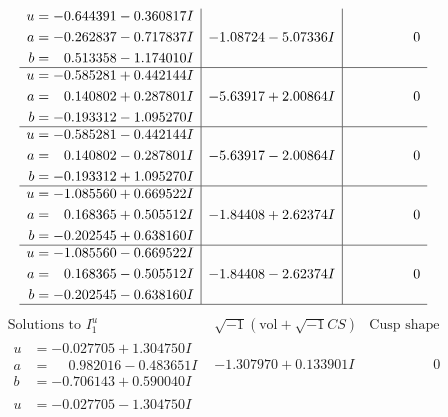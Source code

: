 \documentclass[1p]{elsarticle_modified}
\theoremstyle{definition}
\newcommand{\I}{\sqrt{-1}}
\begin{document}
$$\begin{array}{c|c|c}
\begin{aligned}
u &= -0.644391 - 0.360817 I \\
a &= -0.262837 - 0.717837 I \\
b &= \phantom{-}0.513358 - 1.174010 I\end{aligned}
 & -1.08724 - 5.07336 I & \phantom{-0.000000 } 0 \\ \hline\begin{aligned}
u &= -0.585281 + 0.442144 I \\
a &= \phantom{-}0.140802 + 0.287801 I \\
b &= -0.193312 - 1.095270 I\end{aligned}
 & -5.63917 + 2.00864 I & \phantom{-0.000000 } 0 \\ \hline\begin{aligned}
u &= -0.585281 - 0.442144 I \\
a &= \phantom{-}0.140802 - 0.287801 I \\
b &= -0.193312 + 1.095270 I\end{aligned}
 & -5.63917 - 2.00864 I & \phantom{-0.000000 } 0 \\ \hline\begin{aligned}
u &= -1.085560 + 0.669522 I \\
a &= \phantom{-}0.168365 + 0.505512 I \\
b &= -0.202545 + 0.638160 I\end{aligned}
 & -1.84408 + 2.62374 I & \phantom{-0.000000 } 0 \\ \hline\begin{aligned}
u &= -1.085560 - 0.669522 I \\
a &= \phantom{-}0.168365 - 0.505512 I \\
b &= -0.202545 - 0.638160 I\end{aligned}
 & -1.84408 - 2.62374 I & \phantom{-0.000000 } 0\\
 \hline 
 \end{array}$$\newpage$$\begin{array}{c|c|c}  
\text{Solutions to }I^u_{1}& \I (\text{vol} + \sqrt{-1}CS) & \text{Cusp shape}\\
 \hline 
\begin{aligned}
u &= -0.027705 + 1.304750 I \\
a &= \phantom{-}0.982016 - 0.483651 I \\
b &= -0.706143 + 0.590040 I\end{aligned}
 & -1.307970 + 0.133901 I & \phantom{-0.000000 } 0 \\ \hline\begin{aligned}
u &= -0.027705 - 1.304750 I \\

\end{aligned}
\end{array}$$
\end{document}
